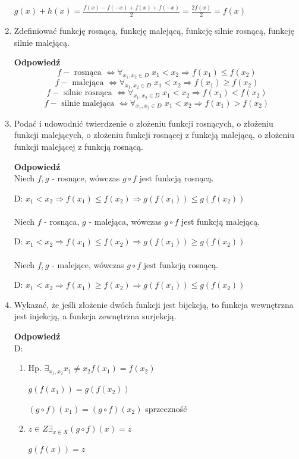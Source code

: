 \documentclass[12pt,a4paper]{article}
\newcounter{twierdzenie}
\theoremstyle{break}
\newcommand{\Odp}[1]{
		\begin{mdframed}[style=zadanie]
			\textbf{Odpowiedź}\\
			#1
		\end{mdframed}
	}
\begin{document}
\begin{enumerate}[1.]
{		$g(x)+h(x)=\frac{f(x)-f(-x)+f(x)+f(-x)}{2}=\frac{2f(x)}{2}=f(x)$  
	}
	
	\item Zdeﬁniować funkcję rosnącą, funkcję malejącą, funkcję silnie rosnącą, funkcję silnie malejącą.
	\Odp{
		$$f-\text{ rosnąca } \Leftrightarrow \forall_{x_1,x_2\in D}\; x_1<x_2\Rightarrow f(x_1)\leq f(x_2)$$
		$$f-\text{ malejąca } \Leftrightarrow \forall_{x_1,x_2\in D}\; x_1<x_2\Rightarrow f(x_1)\geq f(x_2)$$
		$$f-\text{ silnie rosnąca } \Leftrightarrow \forall_{x_1,x_2\in D}\; x_1<x_2\Rightarrow f(x_1)< f(x_2)$$
		$$f-\text{ silnie malejąca } \Leftrightarrow \forall_{x_1,x_2\in D}\; x_1<x_2\Rightarrow f(x_1)> f(x_2)$$
		
	}
	
	\item Podać i udowodnić twierdzenie o złożeniu funkcji rosnących, o złożeniu funkcji malejących, o złożeniu funkcji rosnącej z funkcją malejącą, o złożeniu funkcji malejącej z funkcją rosnącą.
	\Odp{
		Niech $f,g$ - rosnące, wówczas $g\circ f$ jest funkcją rosnącą.
		
		D: $x_1<x_2 \Rightarrow f(x_1)\leq f(x_2) \Rightarrow g(f(x_1))\leq g(f(x_2))$\\\\
		
		Niech $f$ - rosnąca, $g$ - malejąca, wówczas $g\circ f$ jest funkcją malejącą.
		
		D: $x_1<x_2 \Rightarrow f(x_1)\leq f(x_2) \Rightarrow g(f(x_1))\geq g(f(x_2))$\\\\
		
		Niech $f,g$ - malejące, wówczas $g\circ f$ jest funkcją rosnącą.
		
		D: $x_1<x_2 \Rightarrow f(x_1)\geq f(x_2) \Rightarrow g(f(x_1))\leq g(f(x_2))$
	}
	
	\item Wykazać, że jeśli złożenie dwóch funkcji jest bijekcją, to funkcja wewnętrzna jest	injekcją, a funkcja zewnętrzna surjekcją.
	\Odp{
		D: 
		\begin{enumerate}[(1)]
			\item Hp. $\exists_{x_1,x_2} x_1\neq x_2 f(x_1)=f(x_2)$
			
			$g(f(x_1))=g(f(x_2))$
			
			$(g\circ f)(x_1)=(g\circ f)(x_2)$ sprzeczność
			
			\item $z\in Z \exists_{x\in X} (g\circ f)(x)=z$
			
			$g(f(x))=z$
			

\end{enumerate}}
\end{enumerate}
\end{document}
